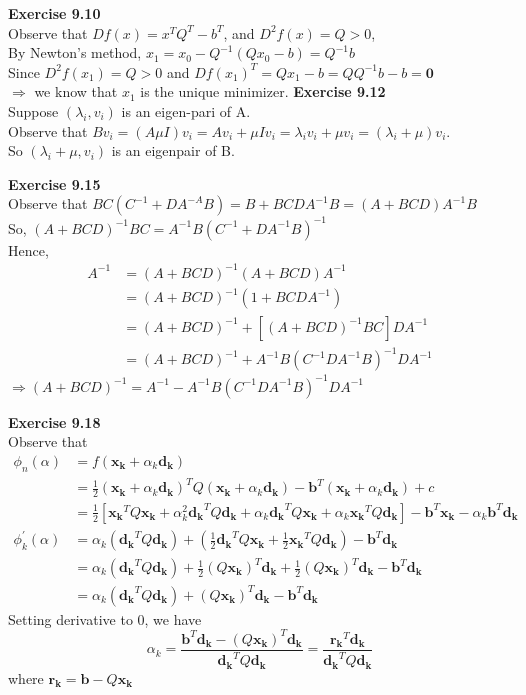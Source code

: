 \documentclass[letterpaper,12pt]{article}
\theoremstyle{definition}
\renewcommand{\vec}[1]{\mathbf{#1}}
\begin{document}
\noindent\textbf{Exercise 9.10}\\
Observe that $Df(x)=x^TQ^T-b^T$, and $D^2f(x)=Q>0$,\\
By Newton's method, $x_1=x_0-Q^{-1}(Qx_0-b)=Q^{-1}b$\\
Since $D^2f(x_1)=Q>0$ and $Df(x_1)^T=Qx_1-b=QQ^{-1}b-b=\vec{0}$ \\
$\Rightarrow$ we know that $x_1$ is the unique minimizer.
\noindent\textbf{Exercise 9.12}\\
Suppose $(\lambda_i,v_i)$ is an eigen-pari of A.\\
Observe that $Bv_i=(A\mu I)v_i=Av_i+\mu Iv_i=\lambda_i v_i+\mu v_i=(\lambda_i +\mu)v_i$.\\
So $(\lambda_i+\mu,v_i)$ is an eigenpair of B.

\noindent\textbf{Exercise 9.15}\\
Observe that $BC(C^{-1}+DA^{-A}B)=B+BCDA^{-1}B=(A+BCD)A^{-1}B$\\
So, $(A+BCD)^{-1}BC=A^{-1}B(C^{-1}+DA^{-1}B)^{-1}$\\
Hence, \\
\begin{align*}
A^{-1}&=(A+BCD)^{-1}(A+BCD)A^{-1}\\
&=(A+BCD)^{-1}(1+BCDA^{-1})\\
&=(A+BCD)^{-1}+[(A+BCD)^{-1}BC]DA^{-1}\\
&=(A+BCD)^{-1}+A^{-1}B(C^{-1}DA^{-1}B)^{-1}DA^{-1}
\end{align*}
$\Rightarrow(A+BCD)^{-1}=A^{-1}-A^{-1}B(C^{-1}DA^{-1}B)^{-1}DA^{-1}$

\noindent\textbf{Exercise 9.18}\\
Observe that \begin{align*}
\phi_n(\alpha)&=f(\vec{x_k}+\alpha_k \vec{d_k})\\
&=\frac{1}{2}(\vec{x_k}+\alpha_k\vec{d_k})^TQ(\vec{x_k}+\alpha_k\vec{d_k})-\vec{b}^T(\vec{x_k}+\alpha_k\vec{d_k})+c\\
&=\frac{1}{2}[\vec{x_k}^TQ\vec{x_k}+\alpha_k^2\vec{d_k}^TQ\vec{d_k}+\alpha_k\vec{d_k}^TQ\vec{x_k}+\alpha_k\vec{x_k}^TQ\vec{d_k}]-\vec{b}^T\vec{x_k}-\alpha_k\vec{b}^T\vec{d_k}\\
\phi_k^'(\alpha)&=\alpha_k(\vec{d_k}^TQ\vec{d_k})+(\frac{1}{2}\vec{d_k}^TQ\vec{x_k}+\frac{1}{2}\vec{x_k}^TQ\vec{d_k})-\vec{b}^T\vec{d_k}\\
&=\alpha_k(\vec{d_k}^TQ\vec{d_k})+\frac{1}{2}(Q\vec{x_k})^T\vec{d_k}+\frac{1}{2}(Q\vec{x_k})^T\vec{d_k}-\vec{b}^T\vec{d_k}\\
&=\alpha_k(\vec{d_k}^TQ\vec{d_k})+(Q\vec{x_k})^T\vec{d_k}-\vec{b}^T\vec{d_k}
\end{align*}
Setting derivative to 0, we have $$\alpha_k=\frac{\vec{b}^T\vec{d_k}-(Q\vec{x_k})^T\vec{d_k}}{\vec{d_k}^TQ\vec{d_k}}=\frac{\vec{r_k}^T\vec{d_k}}{\vec{d_k}^TQ\vec{d_k}}$$
where $\vec{r_k}=\vec{b}-Q\vec{x_k}$
\end{document}
